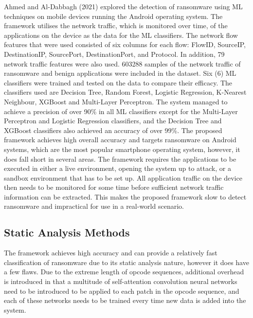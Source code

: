 \documentclass[conference]{IEEEtran}
\begin{document}
Ahmed and Al-Dabbagh (2021) \cite{Ahmed2021} explored the detection of ransomware using ML techniques on mobile devices running the Android operating system. The framework utilises the network traffic, which is monitored over time, of the applications on the device as the data for the ML classifiers. The network flow features that were used consisted of six columns for each flow: FlowID, SourceIP, DestinationIP, SourcePort, DestinationPort, and Protocol. In addition, 79 network traffic features were also used. 603288 samples of the network traffic of ransomware and benign applications were included in the dataset. 
Six (6) ML classifiers were trained and tested on the data to compare their efficacy. The classifiers used are Decision Tree, Random Forest, Logistic Regression, K-Nearest Neighbour, XGBoost and Multi-Layer Perceptron. The system managed to achieve a precision of over 90\% in all ML classifiers except for the Multi-Layer Perceptron and Logistic Regression classifiers, and the Decision Tree and XGBoost classifiers also achieved an accuracy of over 99\%. 
The proposed framework achieves high overall accuracy and targets ransomware on Android systems, which are the most popular smartphone operating system, however, it does fall short in several areas. The framework requires the applications to be executed in either a live environment, opening the system up to attack, or a sandbox environment that has to be set up. All application traffic on the device then needs to be monitored for some time before sufficient network traffic information can be extracted. This makes the proposed framework slow to detect ransomware and impractical for use in a real-world scenario. 

\subsection{Static Analysis Methods}
The framework achieves high accuracy and can provide a relatively fast classification of ransomware due to its static analysis nature, however it does have a few flaws. Due to the extreme length of opcode sequences, additional overhead is introduced in that a multitude of self-attention convolution neural networks need to be introduced to be applied to each patch in the opcode sequence, and each of these networks needs to be trained every time new data is added into the system. \\
\end{document}
